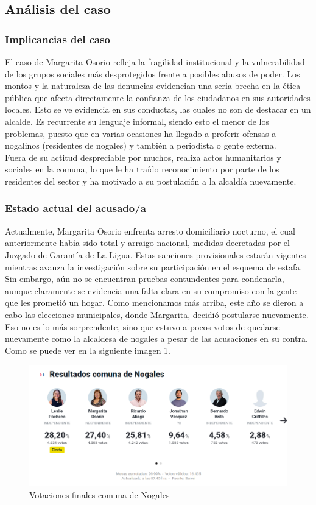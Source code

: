 \documentclass[letter,12pt]{article}
\begin{document}
	
	\subsection{Análisis del caso\\}
	\subsubsection{Implicancias del caso}
	El caso de Margarita Osorio refleja la fragilidad institucional y la vulnerabilidad de los grupos sociales más desprotegidos frente a posibles abusos de poder. Los montos y la naturaleza de las denuncias evidencian una seria brecha en la ética pública que afecta directamente la confianza de los ciudadanos en sus autoridades locales. Esto se ve evidencia en sus conductas, las cuales no son de destacar en un alcalde. Es recurrente su lenguaje informal, siendo esto el menor de los problemas, puesto que en varias ocasiones ha llegado a proferir ofensas a nogalinos (residentes de nogales) y también a periodista o gente externa.\\
	Fuera de su actitud despreciable por muchos, realiza actos humanitarios y sociales en la comuna, lo que le ha traído reconocimiento por parte de los residentes del sector y ha motivado a su postulación a la alcaldía nuevamente.
	
	\subsubsection{Estado actual del acusado/a}
	Actualmente, Margarita Osorio enfrenta arresto domiciliario nocturno, el cual anteriormente había sido total y arraigo nacional, medidas decretadas por el Juzgado de Garantía de La Ligua. Estas sanciones provisionales estarán vigentes mientras avanza la investigación sobre su participación en el esquema de estafa. Sin embargo, aún no se encuentran pruebas contundentes para condenarla, aunque claramente se evidencia una falta clara en su compromiso con la gente que les prometió un hogar. Como mencionamos más arriba, este año se dieron a cabo las elecciones municipales, donde Margarita, decidió postularse nuevamente. Eso no es lo más sorprendente, sino que estuvo a pocos votos de quedarse nuevamente como la alcaldesa de nogales a pesar de las acusaciones en su contra. Como se puede ver en la siguiente imagen \ref{votacion}.
	\begin{figure}[H]
		\centering
		\includegraphics[width=1\textwidth]{figures/votaciones}
		\caption{Votaciones finales comuna de Nogales}\label{votacion}
	\end{figure}
	
\end{document}
